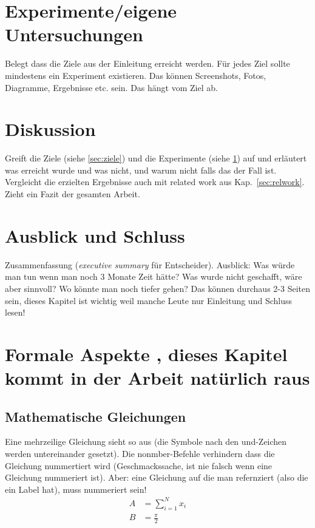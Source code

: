 \documentclass[12pt,oneside]{article}
\begin{document}
\section{Experimente/eigene Untersuchungen}\label{sec:exp}
Belegt dass die Ziele aus der Einleitung erreicht werden. Für jedes Ziel sollte mindestens ein Experiment existieren. Das können Screenshots, Fotos, Diagramme, Ergebnisse etc. sein. Das hängt vom Ziel ab.

\section{Diskussion}
Greift die Ziele (siehe \ref{sec:ziele}) und die Experimente (siehe \ref{sec:exp}) auf und erläutert was erreicht wurde und was nicht, und warum nicht falls das der Fall ist. Vergleicht die erzielten Ergebnisse auch mit related work aus Kap.~\ref{sec:relwork}. Zieht ein Fazit der gesamten Arbeit.

\section{Ausblick und Schluss}
Zusammenfassung (\textit{executive summary} für Entscheider). Ausblick: Was würde man tun wenn man noch 3 Monate Zeit hätte? Was wurde nicht geschafft, wäre aber sinnvoll? Wo könnte man noch tiefer gehen? Das können durchaus 2-3 Seiten sein, dieses Kapitel ist wichtig weil manche Leute nur Einleitung und Schluss lesen!

\clearpage
\def\UrlBreaks{\do\/\do-} %



\appendix

\section{Formale Aspekte , dieses Kapitel kommt in der Arbeit natürlich raus}
%
\subsection{Mathematische Gleichungen}
Eine mehrzeilige Gleichung sieht so aus (die Symbole nach den und-Zeichen werden untereinander gesetzt). Die nonmber-Befehle verhindern dass die Gleichung nummertiert wird (Geschmackssache, ist nie falsch wenn eine Gleichung nummeriert ist). Aber: eine Gleichung auf die man refernziert (also die ein Label hat), muss nummeriert sein!
\begin{align}
    A &= \sum_{i=1}^N x_i \label{eq:1}\nonumber\\
    B &= \frac{\pi}{2}
\end{align}
\end{document}
